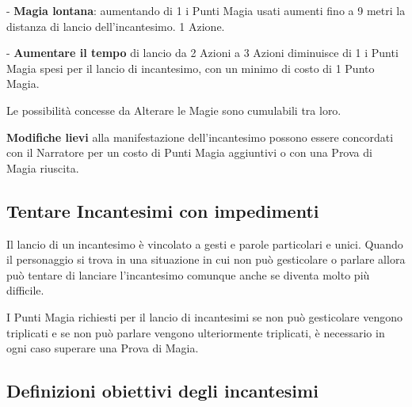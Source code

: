 \begin{multicols}{2}
- \textbf{Magia lontana}: aumentando di 1 i Punti Magia usati aumenti fino a 9 metri la distanza di lancio dell'incantesimo. 1 Azione.

- \textbf{Aumentare il tempo} di lancio da 2 Azioni a 3 Azioni diminuisce di 1 i Punti Magia spesi per il lancio di incantesimo, con un minimo di costo di 1 Punto Magia.


\medskip

Le possibilità concesse da Alterare le Magie sono cumulabili tra loro.

\medskip

\textbf{Modifiche lievi}  alla manifestazione dell'incantesimo possono essere concordati con il Narratore per un costo di Punti Magia aggiuntivi o con una Prova di Magia riuscita.

\subsection{Tentare Incantesimi con impedimenti} \label{magieconimpedimenti}\hypertarget{magieconimpedimenti}{}

Il lancio di un incantesimo è vincolato a gesti e parole particolari e unici. Quando il personaggio si trova in una situazione in cui non può gesticolare o parlare allora può tentare di lanciare l'incantesimo comunque anche se diventa molto più difficile.

I Punti Magia richiesti per il lancio di incantesimi se non può gesticolare vengono triplicati e se non può parlare vengono ulteriormente triplicati, è necessario in ogni caso superare una Prova di Magia.

\subsection{Definizioni obiettivi degli incantesimi}\label{magiedefinizioniobiettivi}


\end{multicols}

